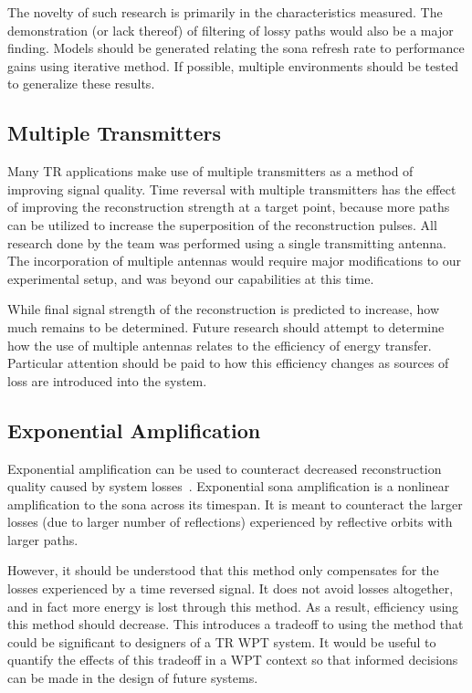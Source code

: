 The novelty of such research is primarily in the characteristics measured. The demonstration (or lack thereof) of filtering of lossy paths would also be a major finding. Models should be generated relating the sona refresh rate to performance gains using iterative method. If possible, multiple environments should be tested to generalize these results.

\subsection{Multiple Transmitters}

Many TR applications make use of multiple transmitters as a method of improving signal quality. Time reversal with multiple transmitters has the effect of improving the reconstruction strength at a target point, because more paths can be utilized to increase the superposition of the reconstruction pulses. All research done by the team was performed using a single transmitting antenna. The incorporation of multiple antennas would require major modifications to our experimental setup, and was beyond our capabilities at this time.

While final signal strength of the reconstruction is predicted to increase, how much remains to be determined. Future research should attempt to determine how the use of multiple antennas relates to the efficiency of energy transfer. Particular attention should be paid to how this efficiency changes as sources of loss are introduced into the system.

\subsection{Exponential Amplification}

Exponential amplification can be used to counteract decreased reconstruction quality caused by system losses~\cite{sherriff2012}. Exponential sona amplification is a nonlinear amplification to the sona across its timespan. It is meant to counteract the larger losses (due to larger number of reflections) experienced by reflective orbits with larger paths.

However, it should be understood that this method only compensates for the losses experienced by a time reversed signal. It does not avoid losses altogether, and in fact more energy is lost through this method. As a result, efficiency using this method should decrease. This introduces a tradeoff to using the method that could be significant to designers of a TR WPT system. It would be useful to quantify the effects of this tradeoff in a WPT context so that informed decisions can be made in the design of future systems.

